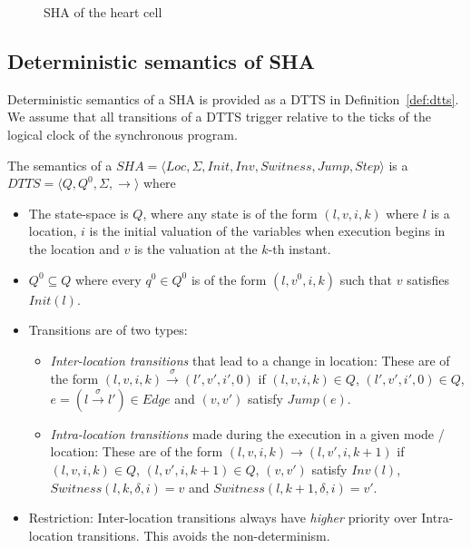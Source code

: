 \begin{figure}
	\centering
	
	\caption{\acf{SHA} of the heart cell \label{fig:heartCellSHA}}
\end{figure}

\subsection{Deterministic semantics of \ac{SHA}}
\label{sec:DTTS}
Deterministic semantics of a \ac{SHA} is provided as a \acf{DTTS} in
Definition~\ref{def:dtts}. We assume that all transitions of a \acf{DTTS}
trigger relative to the ticks of the logical clock of the synchronous
program.

\begin{definition}
	The semantics of a \newline
	$SHA = \langle Loc,  \Sigma, Init, Inv, Switness, Jump, Step \rangle$
	 is a 
	$DTTS = \langle Q, Q^0, \Sigma, \rightarrow \rangle$ where
	
	\begin{itemize}
		\item The state-space is $Q$, where any state is of the form
		$(l, v, i, k)$ where $l$ is a location, $i$ is the initial valuation
		of the variables when execution begins in the location and $v$ is
		the valuation at the $k$-th instant.
		\item $Q^0 \subseteq Q$ where every $q^0 \in Q^0$ is of the form
		$(l, v^0, i, k)$ such that $v$ satisfies $Init(l)$.
		\item Transitions are of two types:
		\begin{itemize}
			\item \emph{Inter-location transitions} that lead to a change in location:
			These are of the form
			$(l, v, i, k) \stackrel{\sigma} \rightarrow (l', v', i', 0)$ if
			$(l, v, i, k) \in Q$, $(l', v', i', 0) \in Q$,
			$e=(l \stackrel{\sigma} \rightarrow l') \in Edge$ and $(v, v')$
			satisfy $Jump(e)$.
			\item \emph{Intra-location transitions} made during the execution in
			a given mode / location: These are of the form
			$(l, v, i, k) \rightarrow (l, v', i, k+1)$ if
			$(l, v, i, k) \in Q$, $(l, v', i, k+1) \in Q$, $(v, v')$ satisfy
			$Inv(l)$, $Switness(l,k,\delta,i)=v$ and $Switness(l,k+1,\delta,i)=v'$.
		\end{itemize}
		
			\item Restriction: Inter-location transitions always have \emph{higher} priority
			over {Intra-location transitions}. This avoids the non-determinism.
	\end{itemize}
	\label{def:dtts}
\end{definition}

